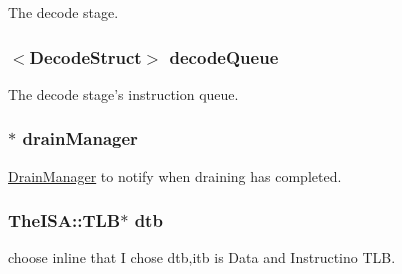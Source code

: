 \label{classFullO3CPU_a21ddb57c5e4f70298cee97ee543e3bdb}
The decode stage. \hypertarget{classFullO3CPU_a8c674fbc9b0625a2231b669aceb0dd73}{
\subsubsection[{decodeQueue}]{$<${\bf DecodeStruct}$>$ {\bf decodeQueue}}}
\label{classFullO3CPU_a8c674fbc9b0625a2231b669aceb0dd73}
The decode stage's instruction queue. \hypertarget{classFullO3CPU_a329b71fb934a93312ca0aacbf5a3f982}{
\subsubsection[{drainManager}]{$\ast$ {\bf drainManager}}}
\label{classFullO3CPU_a329b71fb934a93312ca0aacbf5a3f982}
\hyperlink{classDrainManager}{DrainManager} to notify when draining has completed. \hypertarget{classFullO3CPU_ad2fd039621f87592c4b344d4f8948e78}{
\subsubsection[{dtb}]{\setlength{\rightskip}{0pt plus 5cm}TheISA::TLB$\ast$ {\bf dtb}}}
\label{classFullO3CPU_ad2fd039621f87592c4b344d4f8948e78}


choose inline that I chose dtb,itb is Data and Instructino TLB. 

